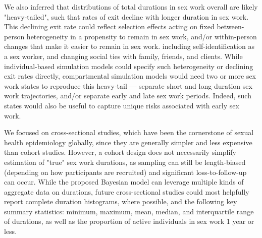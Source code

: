 We also inferred that distributions of total durations in sex work overall
are likely "heavy-tailed", such that
rates of exit decline with longer duration in sex work.
This declining exit rate could reflect
selection effects acting on fixed between-person heterogeneity in
a propensity to remain in sex work,\cite{Balan2020}
and/or within-person changes that make it easier to remain in sex work.
including self-identification as a sex worker, and
changing social ties with family, friends, and clients.
\cite{Neufeld2023,Bhattacharjee2023,Ingabire2012,Bowen2011,Lora2025}
While individual-based simulation models could specify
such heterogeneity or declining exit rates directly,
compartmental simulation models would need
two or more sex work states to reproduce this heavy-tail --- \eg
separate short and long duration sex work trajectories, and/or
separate early and late sex work periods.
Indeed, such states would also be useful to capture
unique risks associated with early sex work.
\cite{Neufeld2023,Bhattacharjee2023}
\par %
We focused on cross-sectional studies,
which have been the cornerstone of sexual health epidemiology globally,\cite{WHO2017bbs,DHS}
since they are generally simpler and less expensive than cohort studies.\cite{Fazito2012}
However, a cohort design
does not necessarily simplify estimation of "true" sex work durations,
as sampling can still be length-biased
(depending on how participants are recruited)
and significant loss-to-follow-up can occur.\cite{Ward2006}
While the proposed Bayesian model can leverage
multiple kinds of aggregate data on durations,
future cross-sectional studies could most helpfully report
complete duration histograms, where possible,
and the following key summary statistics:
minimum, maximum, mean, median, and interquartile range of durations,
as well as the proportion of active individuals in sex work 1 year or less.
